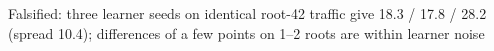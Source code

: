 Falsified: three learner seeds on identical root-42 traffic give 18.3 / 17.8 / 28.2 (spread 10.4); differences of a few points on 1--2 roots are within learner noise